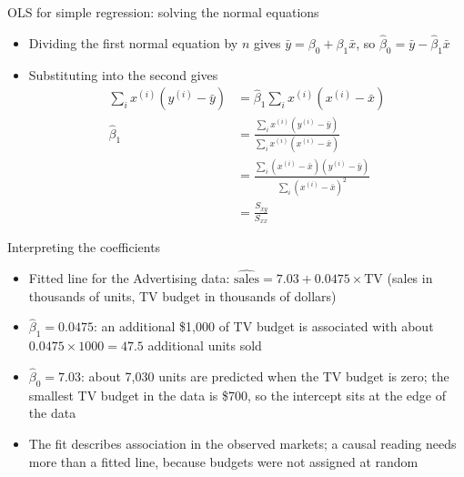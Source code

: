 \begin{frame}{OLS for simple regression: solving the normal equations}
    \begin{itemize}
        \item Dividing the first normal equation by $n$ gives $\bar{y} = \beta_0 + \beta_1 \bar{x}$, so $\boxed{\hat\beta_0 = \bar{y} - \hat\beta_1 \bar{x}}$
        \item Substituting into the second gives
        \begin{align*}
            \sum_i x^{(i)} (y^{(i)} - \bar{y}) &= \hat\beta_1 \sum_i x^{(i)} (x^{(i)} - \bar{x}) \\
            \hat\beta_1 &= \frac{\sum_i x^{(i)} (y^{(i)} - \bar{y})}{\sum_i x^{(i)} (x^{(i)} - \bar{x})} \\
            &= \frac{\sum_i (x^{(i)} - \bar{x}) (y^{(i)} - \bar{y})}{\sum_i (x^{(i)} - \bar{x})^2} \\
            &= \frac{S_{xy}}{S_{xx}}
        \end{align*}
    \end{itemize}
\end{frame}


\begin{frame}{Interpreting the coefficients}
    \begin{itemize}
        \item Fitted line for the Advertising data: $\widehat{\text{sales}} = 7.03 + 0.0475 \times \text{TV}$ (sales in thousands of units, TV budget in thousands of dollars)
        \item $\hat\beta_1 = 0.0475$: an additional \$1,000 of TV budget is associated with about $0.0475 \times 1000 = 47.5$ additional units sold
        \item $\hat\beta_0 = 7.03$: about 7,030 units are predicted when the TV budget is zero; the smallest TV budget in the data is \$700, so the intercept sits at the edge of the data
        \item The fit describes association in the observed markets; a causal reading needs more than a fitted line, because budgets were not assigned at random
    \end{itemize}
\end{frame}


